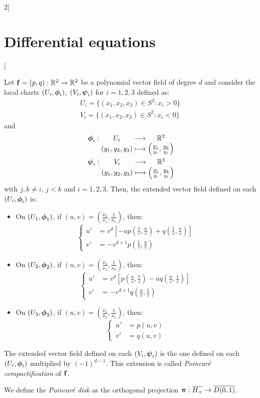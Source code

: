 \documentclass[../../../main.tex]{subfiles}
\begin{document}
\begin{multicols}{2}[\section{Differential equations}]
\begin{proposition}
  \end{proposition}
  \begin{corollary}
    Let $\boldsymbol{\mathrm{f}}=(p,q):\mathbb{R}^2\rightarrow\mathbb{R}^2$ be a polynomial vector field of degree $d$ and consider the local charts $(U_i,\boldsymbol{\mathrm{\phi}}_i)$, $(V_i,\boldsymbol{\mathrm{\psi}}_i)$ for $i=1,2,3$ defined as:
    \begin{gather*}
      U_i=\{(x_1,x_2,x_3)\in S^2:x_i>0\}\\
      V_i=\{(x_1,x_2,x_3)\in S^2:x_i<0\}
    \end{gather*}
    and
    \begin{gather*}
      \function{\vf\phi_i}{U_i}{\RR^2}{(y_1,y_2,y_3)}{\left(\frac{y_j}{y_i},\frac{y_k}{y_i}\right)}\\
      \function{\vf\psi_i}{V_i}{\RR^2}{(y_1,y_2,y_3)}{\left(\frac{y_j}{y_i},\frac{y_k}{y_i}\right)}
    \end{gather*}
    with $j,k\ne i$, $j<k$ and $i=1,2,3$. Then, the extended vector field defined on each $(U_i,\boldsymbol{\mathrm{\phi}}_i)$ is:
    \begin{itemize}
      \item On $(U_1,\boldsymbol{\mathrm{\phi}}_1)$, if $(u,v)=\left(\frac{x_2}{x_1},\frac{1}{x_1}\right)$, then:
            $$
              \left\{
              \begin{aligned}
                u' & =v^d\left[-up\left(\frac{1}{v},\frac{u}{v}\right)+q\left(\frac{1}{v},\frac{u}{v}\right)\right] \\
                v' & =-v^{d+1}p\left(\frac{1}{v},\frac{u}{v}\right)
              \end{aligned}
              \right.
            $$
      \item On $(U_2,\boldsymbol{\mathrm{\phi}}_2)$, if $(u,v)=\left(\frac{x_3}{x_2},\frac{1}{x_2}\right)$, then:
            $$
              \left\{
              \begin{aligned}
                u' & =v^d\left[p\left(\frac{u}{v},\frac{1}{v}\right)-uq\left(\frac{u}{v},\frac{1}{v}\right)\right] \\
                v' & =-v^{d+1}q\left(\frac{u}{v},\frac{1}{v}\right)
              \end{aligned}
              \right.
            $$
      \item On $(U_3,\boldsymbol{\mathrm{\phi}}_3)$, if $(u,v)=\left(\frac{x_1}{x_3},\frac{1}{x_3}\right)$, then:
            $$
              \left\{
              \begin{aligned}
                u' & =p(u,v) \\
                v' & =q(u,v)
              \end{aligned}
              \right.
            $$
    \end{itemize}
    The extended vector field defined on each $(V_i,\boldsymbol{\mathrm{\psi}}_i)$ is the one defined on each $(U_i,\boldsymbol{\mathrm{\phi}}_i)$ multiplied by ${(-1)}^{d-1}$.
    This extension is called \emph{Poincaré compactification} of $\boldsymbol{\mathrm{f}}$.
  \end{corollary}
  \begin{definition}
    We define the \emph{Poincaré disk} as the orthogonal projection $\boldsymbol{\mathrm{\pi}}: \overline{H_+}\rightarrow \overline{D(0,1)}$.
  \end{definition}

\end{multicols}
\end{document}
